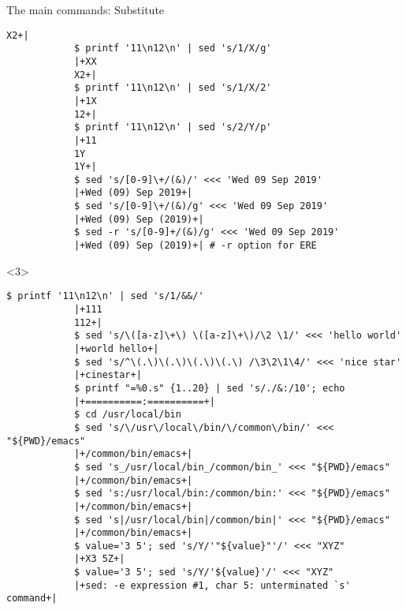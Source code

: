 \begin{frame}[fragile]{The main commands: Substitute}
\begin{onlyenv}
\begin{lstlisting}[style=MyBash]
            X2+|
            $ printf '11\n12\n' | sed 's/1/X/g'
            |+XX
            X2+|
            $ printf '11\n12\n' | sed 's/1/X/2'
            |+1X
            12+|
            $ printf '11\n12\n' | sed 's/2/Y/p'
            |+11
            1Y
            1Y+|
            $ sed 's/[0-9]\+/(&)/' <<< 'Wed 09 Sep 2019'
            |+Wed (09) Sep 2019+|
            $ sed 's/[0-9]\+/(&)/g' <<< 'Wed 09 Sep 2019'
            |+Wed (09) Sep (2019)+|
            $ sed -r 's/[0-9]+/(&)/g' <<< 'Wed 09 Sep 2019'
            |+Wed (09) Sep (2019)+| # -r option for ERE
        \end{lstlisting}
    \end{onlyenv}
    \begin{onlyenv}<3>
        \begin{lstlisting}[style=MyBash, firstnumber=23, xrightmargin=2mm]
            $ printf '11\n12\n' | sed 's/1/&&/'
            |+111
            112+|
            $ sed 's/\([a-z]\+\) \([a-z]\+\)/\2 \1/' <<< 'hello world'
            |+world hello+|
            $ sed 's/^\(.\)\(.\)\(.\)\(.\) /\3\2\1\4/' <<< 'nice star'
            |+cinestar+|
            $ printf "=%0.s" {1..20} | sed 's/./&:/10'; echo
            |+==========:==========+|
            $ cd /usr/local/bin
            $ sed 's/\/usr\/local\/bin/\/common\/bin/' <<< "${PWD}/emacs"
            |+/common/bin/emacs+|
            $ sed 's_/usr/local/bin_/common/bin_' <<< "${PWD}/emacs"
            |+/common/bin/emacs+|
            $ sed 's:/usr/local/bin:/common/bin:' <<< "${PWD}/emacs"
            |+/common/bin/emacs+|
            $ sed 's|/usr/local/bin|/common/bin|' <<< "${PWD}/emacs"
            |+/common/bin/emacs+|
            $ value='3 5'; sed 's/Y/'"${value}"'/' <<< "XYZ"
            |+X3 5Z+|
            $ value='3 5'; sed 's/Y/'${value}'/' <<< "XYZ"
            |+sed: -e expression #1, char 5: unterminated `s' command+|
        \end{lstlisting}
    \end{onlyenv}
\end{frame}
